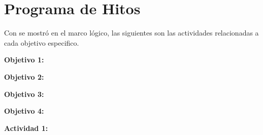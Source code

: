\section{Programa de Hitos}

Con se mostró en el marco lógico, las siguientes son las actividades relacionadas a cada objetivo especifico.

\textbf{Objetivo 1:} \objetivoEspecificoA
\objetivoEspecificoAActividades

\textbf{Objetivo 2:} \objetivoEspecificoB
\objetivoEspecificoBActividades

\textbf{Objetivo 3:} \objetivoEspecificoC
\objetivoEspecificoCActividades

\textbf{Objetivo 4:} \objetivoEspecificoD
\objetivoEspecificoDActividades

\textbf{Actividad 1:} \objetivoEspecificoDocument
\objetivoEspecificoDocumentActividades

